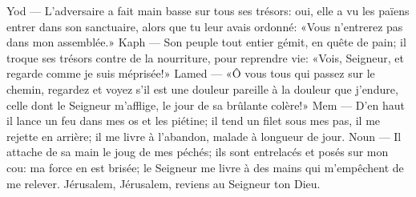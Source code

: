 Yod --- L’adversaire a fait main basse sur tous ses trésors:
	oui, elle a vu les païens entrer dans son sanctuaire,
	alors que tu leur avais ordonné: «Vous n’entrerez pas dans mon assemblée.»
Kaph --- Son peuple tout entier gémit, en quête de pain;
	il troque ses trésors contre de la nourriture, pour reprendre vie:
	«Vois, Seigneur, et regarde comme je suis méprisée!»
Lamed --- «Ô vous tous qui passez sur le chemin,
	regardez et voyez s’il est une douleur pareille à la douleur que j’endure,
	celle dont le Seigneur m’afflige, le jour de sa brûlante colère!»
Mem --- D’en haut il lance un feu dans mes os et les piétine;
	il tend un filet sous mes pas, il me rejette en arrière;
	il me livre à l’abandon, malade à longueur de jour.
Noun --- Il attache de sa main le joug de mes péchés;
	ils sont entrelacés et posés sur mon cou: ma force en est brisée;
	le Seigneur me livre à des mains qui m’empêchent de me relever.
Jérusalem, Jérusalem, reviens au Seigneur ton Dieu.
